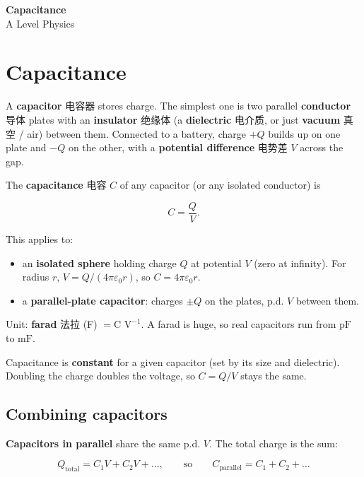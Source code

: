 \documentclass[11pt]{article}
\begin{document}
\begin{center}
  {\LARGE\bfseries Capacitance}\\[0.35em]
  {\large A Level Physics}
\end{center}
\vspace{0.6em}

\section*{Capacitance}

A \textbf{capacitor} 电容器 stores charge. The simplest one is two parallel \textbf{conductor} 导体 plates with an \textbf{insulator} 绝缘体 (a \textbf{dielectric} 电介质, or just \textbf{vacuum} 真空 / air) between them. Connected to a battery, charge $+Q$ builds up on one plate and $-Q$ on the other, with a \textbf{potential difference} 电势差 $V$ across the gap.

The \textbf{capacitance} 电容 $C$ of any capacitor (or any isolated conductor) is

\[
C = \frac{Q}{V}.
\]

This applies to:

\begin{itemize}
\item an \textbf{isolated sphere} holding charge $Q$ at potential $V$ (zero at infinity). For radius $r$, $V = Q/(4\pi\varepsilon_{0}r)$, so $C = 4\pi\varepsilon_{0} r$.

\item a \textbf{parallel-plate capacitor}: charges $\pm Q$ on the plates, p.d. $V$ between them.

\end{itemize}

Unit: \textbf{farad} 法拉 (F) $= \text{C V}^{-1}$. A farad is huge, so real capacitors run from $\text{pF}$ to $\text{mF}$.

Capacitance is \textbf{constant} for a given capacitor (set by its size and dielectric). Doubling the charge doubles the voltage, so $C = Q/V$ stays the same.

\subsection*{Combining capacitors}

\textbf{Capacitors in parallel} share the same p.d. $V$. The total charge is the sum:

\[
Q_{\text{total}} = C_{1} V + C_{2} V + \ldots, \qquad\text{so}\qquad C_{\text{parallel}} = C_{1} + C_{2} + \ldots
\]
\end{document}
